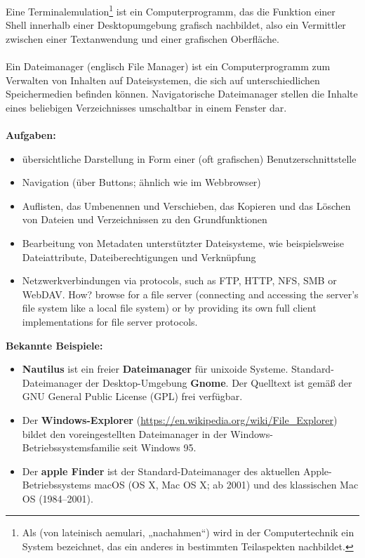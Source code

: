 Eine Terminalemulation\footnote{Als  (von lateinisch aemulari, „nachahmen“) wird in der Computertechnik ein System bezeichnet, das ein anderes in bestimmten Teilaspekten nachbildet.} ist ein Computerprogramm, das die Funktion einer Shell innerhalb einer Desktopumgebung grafisch nachbildet, also ein Vermittler zwischen einer Textanwendung und einer grafischen Oberfläche.
%
~\\
\\
Ein Dateimanager (englisch File Manager) ist ein Computerprogramm zum Verwalten von Inhalten auf Dateisystemen, die sich auf unterschiedlichen Speichermedien befinden können. Navigatorische Dateimanager stellen die Inhalte eines beliebigen Verzeichnisses umschaltbar in einem Fenster dar.\\
 ~\\
\textbf{Aufgaben:}
\begin{itemize}
	\item übersichtliche Darstellung in Form einer (oft grafischen) Benutzerschnittstelle 
	\item Navigation (über Buttons; ähnlich wie im Webbrowser)
	\item Auflisten, das Umbenennen und Verschieben, das Kopieren und das Löschen von Dateien und Verzeichnissen zu den Grundfunktionen
	\item Bearbeitung von Metadaten unterstützter Dateisysteme, wie beispielsweise Dateiattribute, Dateiberechtigungen und Verknüpfung
	\item Netzwerkverbindungen via protocols, such as FTP, HTTP, NFS, SMB or WebDAV. How? browse for a file server (connecting and accessing the server's file system like a local file system) or by providing its own full client implementations for file server protocols. 
\end{itemize}
\textbf{Bekannte Beispiele:} %
\begin{itemize}
	\item \textbf{Nautilus} ist ein freier \textbf{Dateimanager} für unixoide Systeme. Standard-Dateimanager der Desktop-Umgebung \textbf{Gnome}.	Der Quelltext ist gemäß der GNU General Public License (GPL) frei verfügbar. 
	\item Der \textbf{Windows-Explorer} (\url{https://en.wikipedia.org/wiki/File_Explorer}) bildet den voreingestellten Dateimanager in der Windows-Betriebssystemsfamilie seit Windows 95. 
	\item Der \textbf{apple Finder} ist der Standard-Dateimanager des aktuellen Apple-Betriebssystems macOS (OS X, Mac OS X; ab 2001) und des klassischen Mac OS (1984–2001). 
\end{itemize}
